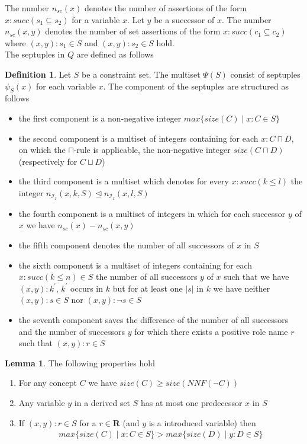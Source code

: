 \documentclass[a4paper,11pt]{scrartcl}
\theoremstyle{break}
\theoremstyle{definition}
\newtheorem{mydef}{Definition}
\newtheorem{mylem}{Lemma}
\begin{document}
The number $n_{sc}(x)$ denotes the number of assertions of the form $x:succ(s_1\subseteq s_2)$ for a variable $x$. Let $y$ be a successor of $x$. The number $n_{sc}(x,y)$ denotes the number of set assertions of the form $x:succ(c_1\subseteq c_2)$ where $(x,y):s_1\in S$ and $(x,y):s_2\in S$ hold.\\
The septuples in $Q$ are defined as follows
\begin{mydef}
Let $S$ be a constraint set. The multiset $\Psi(S)$ consist of septuples $\psi_S(x)$ for each variable $x$. The component of the septuples are structured as follows
\begin{itemize}
\item the first component is a non-negative integer $max\{size(C)\mid x:C\in S\}$
\item the second component is a multiset of integers containing for each $x:C\sqcap D$, on which the $\sqcap$-rule is applicable, the non-negative integer $size(C\sqcap D)$ (respectively for $C\sqcup D$)
\item the third component is a multiset which denotes for every $x:succ(k\leq l)$ the integer $n_{\mathcal{I}_I}(x,k,S)\unlhd n_{\mathcal{I}_I}(x,l,S)$
\item the fourth component is a multiset of integers in which for each successor $y$ of $x$ we have $n_{sc}(x)-n_{sc}(x,y)$
\item the fifth component denotes the number of all successors of $x$ in $S$
\item the sixth component is a multiset of integers containing for each $x:succ(k\leq n)\in S$ the number of all successors $y$ of $x$ such that we have $(x,y):k^\prime$, $k^\prime$ occurs in $k$ but for at least one $|s|$ in $k$ we have neither $(x,y):s\in S$ nor $(x,y):\neg s\in S$
\item the seventh component saves the difference of the number of all successors and the number of successors $y$ for which there exists a positive role name $r$ such that $(x,y):r\in S$
\end{itemize}
\end{mydef}
\begin{mylem}
The following properties hold
\begin{enumerate}
\item For any concept $C$ we have $size(C)\geq size(NNF(\neg C))$
 \item Any variable $y$ in a derived set $S$ has at most one predecessor $x$ in $S$
\item If $(x,y):r\in S$ for a $r\in\mathbf{R}$ (and $y$ is a introduced variable) then 
\begin{align*}
max\{size(C)\mid x:C\in S\}>max\{size(D)\mid y:D \in S\}
\end{align*}
\end{enumerate}
\end{mylem}
\end{document}
